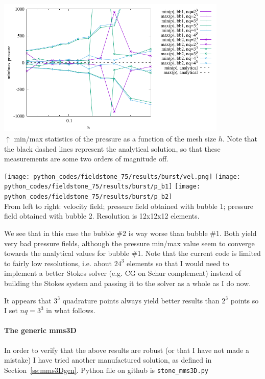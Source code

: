 \begin{center}
\includegraphics[width=11cm]{python_codes/fieldstone_75/results/burst/p_stats.pdf}\\
{\captionfont $\uparrow$ min/max statistics of the pressure as a function of the mesh size $h$. Note that 
the black dashed lines represent the analytical solution, so that these measurements are some two 
orders of magnitude off.}
\end{center}

\begin{center}
\texttt{[image: python\_codes/fieldstone\_75/results/burst/vel.png]}
\texttt{[image: python\_codes/fieldstone\_75/results/burst/p\_b1]}
\texttt{[image: python\_codes/fieldstone\_75/results/burst/p\_b2]}\\
{\captionfont From left to right: velocity field; pressure field obtained with bubble 1;
pressure field obtained with bubble 2. Resolution is 12x12x12 elements.}
\end{center}

We see that in this case the bubble \#2 is way worse than bubble \#1. Both 
yield very bad pressure fields, although the pressure min/max value seem to converge 
towards the analytical values for bubble \#1. 
Note that the current code is limited to fairly low resolutions, i.e. about $24^3$ elements so that
I would need to implement a better Stokes solver (e.g. CG on Schur complement) instead 
of building the Stokes system and passing it to the solver as a whole as I do now. %

It appears that $3^3$ quadrature points always yield better results than $2^3$ points
so I set $nq=3^3$ in what follows.

\paragraph{The generic mms3D} In order to verify that 
the above results are robust (or that I have not made a mistake)
I have tried another manufactured solution, as defined in Section~\ref{ss:mms3Dgen}. 
Python file on github is {\tt stone\_mms3D.py}

